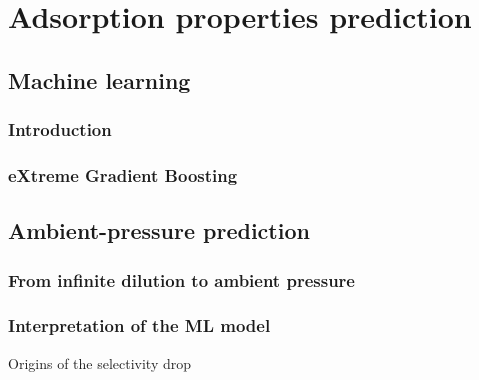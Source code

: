 \documentclass[main]{subfiles}
\begin{document}
\chapter{Adsorption properties prediction}
\vspace*{-1\baselineskip}
\section{Machine learning}

\subsection{Introduction}

\subsection{eXtreme Gradient Boosting}

\section{Ambient-pressure prediction}

\subsection{From infinite dilution to ambient pressure}

\subsection{Interpretation of the ML model}

Origins of the selectivity drop

\OnlyInSubfile{\printglobalbibliography}
\end{document}
